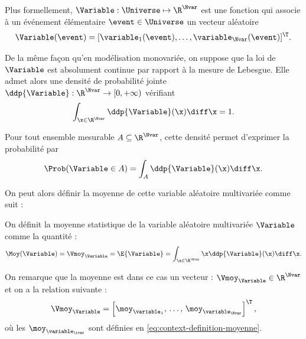   Plus formellement,
  $\Variable:\Universe\mapsto\R^\Nvar$ est une fonction qui associe
  à un événement élémentaire $\event\in\Universe$ un vecteur aléatoire
\begin{equation*}
  \Variable(\event)
  =
  [\variable_1(\event),\dots,\variable_\Nvar(\event)]^\T.
\end{equation*}

  De la même façon qu'en modélisation monovariée, on suppose que la loi de $\Variable$ est absolument continue par
  rapport à la mesure de Lebesgue. Elle admet alors une densité de
  probabilité jointe $\ddp{\Variable}:\R^\Nvar\to[0,+\infty)$
  vérifiant
  \begin{equation*}
    \int_{\x\in\R^\Nvar}
    \ddp{\Variable}(\x)\diff\x
    =
    1.
  \end{equation*}

  Pour tout ensemble mesurable $A\subseteq\R^\Nvar$, cette densité
  permet d'exprimer la probabilité par
  \begin{equation}
    \Prob(\Variable\in A)
    =
    \int_A
    \ddp{\Variable}(\x)\diff\x.
    \label{eq:context-definition-ddpmultivariee}
  \end{equation}


On peut alors définir la moyenne de cette variable aléatoire multivariée
comme suit :

\begin{definition}
\label{def:context-definition-moyennemultivariee}
  On définit la moyenne statistique de la variable aléatoire multivariée
  $\Variable$ comme la quantité :
\begin{equation}
  \Moy(\Variable)
  =
  \Vmoy_{\Variable}
  =
  \E\{\Variable\}
  =
  \int_{\x\in\R^\Nvar}
  \x\ddp{\Variable}(\x)\diff\x.
  \label{eq:context-definition-moyennemultivariee}
\end{equation}
\end{definition}


\begin{remark}
  On remarque que la moyenne est dans ce cas un vecteur :
  $\Vmoy_{\Variable}\in\R^\Nvar$ et on a la relation suivante :
\begin{equation}
  \Vmoy_{\Variable}
  =
  \left[
    \moy_{\variable_1},\,
    \dots,\,
    \moy_{\variable_\Nvar}
  \right]^\T,
\end{equation}
  où les $\moy_{\variable_\ivar}$ sont définies en
  \cref{eq:context-definition-moyenne}.
\end{remark}



